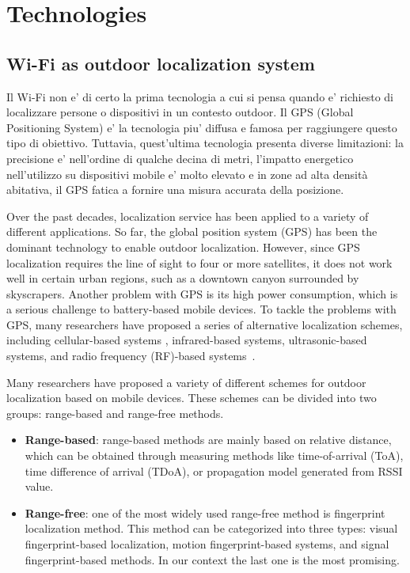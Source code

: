 \section{Technologies}

\subsection{Wi-Fi as outdoor localization system}

Il Wi-Fi non e' di certo la prima tecnologia a cui si pensa quando e' richiesto di localizzare persone o dispositivi
in un contesto outdoor. Il GPS (Global Positioning System) e' la tecnologia piu' diffusa e famosa per raggiungere questo
tipo di obiettivo. Tuttavia, quest'ultima tecnologia presenta diverse limitazioni: la precisione e' nell'ordine di qualche
decina di metri, l'impatto energetico nell'utilizzo su dispositivi mobile e' molto elevato e in zone ad alta densità 
abitativa, il GPS fatica a fornire una misura accurata della posizione.

Over the past decades, localization service has been applied to a variety of different applications.
So far, the global position system (GPS) has been the dominant technology to enable outdoor localization.
However, since GPS localization requires the line of sight to four or more satellites, it does not work well in certain urban regions,
such as a downtown canyon surrounded by skyscrapers.
Another problem with GPS is its high power consumption, which is a serious challenge to battery-based mobile devices.
To tackle the problems with GPS, many researchers have proposed a series of alternative localization schemes, including cellular-based systems \cite{ibrahim2010cellsense},
infrared-based systems, ultrasonic-based systems, and radio frequency (RF)-based systems~\cite{bahl2000radar, youssef2002probabilistic}.

Many researchers have proposed a variety of different schemes for outdoor localization based on mobile
devices. These schemes can be divided into two groups: range-based and range-free methods.

\begin{itemize}
    \item \textbf{Range-based}: range-based methods are mainly based on relative distance, which can be obtained through measuring methods like time-of-arrival (ToA),
    time difference of arrival (TDoA), or propagation model generated from RSSI value.
    \item \textbf{Range-free}: one of the most widely used range-free method is fingerprint localization method. This method can be categorized into three types: visual fingerprint-based localization, motion fingerprint-based systems, and
    signal fingerprint-based methods. In our context the last one is the most promising.
\end{itemize}

